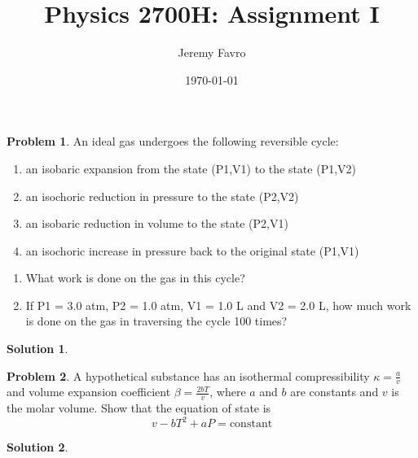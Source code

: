 \documentclass[10pt]{article}
\title{Physics 2700H: Assignment I}
\author{Jeremy Favro}
\date{\today}
\theoremstyle{definition}
\newtheorem{problem}{Problem}
\newtheorem{soln}{Solution}
\begin{document}
\maketitle

\begin{problem}
  An ideal gas undergoes the following reversible cycle:
  \begin{enumerate}[label=(\roman*)]
    \item an isobaric expansion from the state (P1,V1) to the state (P1,V2)
    \item an isochoric reduction in pressure to the state (P2,V2)
    \item an isobaric reduction in volume to the state (P2,V1)
    \item an isochoric increase in pressure back to the original state (P1,V1)
  \end{enumerate}
  \begin{enumerate}[label=(\alph*)]
    \item What work is done on the gas in this cycle?
    \item If P1 = 3.0 atm, P2 = 1.0 atm, V1 = 1.0 L and V2 = 2.0 L, how much work is done on the gas in traversing the cycle 100 times?
  \end{enumerate}
\end{problem}
\begin{soln}
\end{soln}

\begin{problem}
A hypothetical substance has an isothermal compressibility $\kappa = \frac{a}{v}$ and volume expansion coefficient $\beta=\frac{2bT}{v}$, 
where $a$ and $b$ are constants and $v$ is the molar volume. Show that the equation of state is $$v-bT^2+aP=\mathrm{constant}$$
\end{problem}
\begin{soln}
\end{soln}
\end{document}
